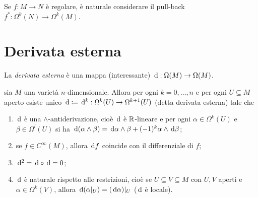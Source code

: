 \begin{remark}
	Se $f:M\to N$ è regolare, è naturale considerare il pull-back $f^*: \Omega^k(N) \to \Omega^k(M)$.
\end{remark}

\section{Derivata esterna}

La \emph{derivata esterna} è una mappa (interessante) $\,\mathrm d:\Omega(M) \to \Omega(M)$.

\begin{theorem}
	sia $M$ una varietà $n$-dimensionale. Allora per ogni $k=0,\ldots,n$ e per ogni $U\subseteq M$ aperto esiste unico $\,\mathrm d \coloneqq \,\mathrm d^k : \Omega^k(U) \to \Omega^{k+1}(U)$ (detta derivata esterna) tale che
	\begin{enumerate}
		\item $\,\mathrm d$ è una $\wedge$-antiderivazione, cioè $\,\mathrm d$ è $\mathbb R$-lineare e per ogni $\alpha\in\Omega^k(U)$ e $\beta\in\Omega^l(U)$ si ha $\,\mathrm d(\alpha\wedge\beta) = \,\mathrm d\alpha \wedge \beta +(-1)^k \alpha\wedge \,\mathrm d \beta$;
		\item se $f\in C^\infty(M)$, allora $\,\mathrm d f$ coincide con il differenziale di $f$;
		\item $\,\mathrm d^2 = \,\mathrm d\circ \,\mathrm d = 0$;
		\item $\,\mathrm d$ è naturale rispetto alle restrizioni, cioè se $U\subseteq V \subseteq M$ con $U,V$ aperti e $\alpha\in\Omega^k(V)$, allora $\,\mathrm d(\alpha|_ U) = (\,\mathrm d\alpha)|_ U$ ($\,\mathrm d$ è locale).
	\end{enumerate}
\end{theorem}

